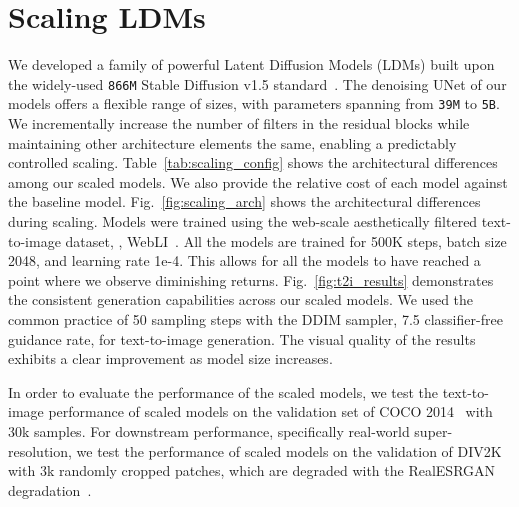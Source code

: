 \section{Scaling LDMs}
%
We developed a family of powerful Latent Diffusion Models (LDMs) built upon the widely-used \texttt{866M} Stable Diffusion v1.5 standard~\cite{rombach2022high}. The denoising UNet of our models offers a flexible range of sizes, with parameters spanning from \texttt{39M} to \texttt{5B}.
%
We incrementally increase the number of filters in the residual blocks while maintaining other architecture elements the same, enabling a predictably controlled scaling.
%
Table~\ref{tab:scaling_config} shows the architectural differences among our scaled models.
%
We also provide the relative cost of each model against the baseline model.
Fig.~\ref{fig:scaling_arch} shows the architectural differences during scaling.
Models were trained using the web-scale aesthetically filtered text-to-image dataset, \ie, WebLI~\cite{chen2022pali}.
All the models are trained for 500K steps, batch size 2048, and learning rate 1e-4.
This allows for all the models to have reached a point where we observe diminishing returns.
Fig.~\ref{fig:t2i_results} demonstrates the consistent generation capabilities across our scaled models. We used the common practice of 50 sampling steps with the DDIM sampler, 7.5 classifier-free guidance rate, for text-to-image generation. The visual quality of the results exhibits a clear improvement as model size increases.

In order to evaluate the performance of the scaled models, we test the text-to-image performance of scaled models on the validation set of COCO 2014~\cite{lin2014microsoft} with 30k samples.
For downstream performance, specifically real-world super-resolution, we test the performance of scaled models on the validation of DIV2K with 3k randomly cropped patches, which are degraded with the RealESRGAN degradation~\cite{wang2021real}.


